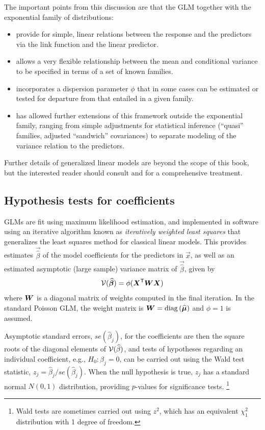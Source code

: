 \documentclass[11pt]{book}\usepackage[]{graphicx}\usepackage[]{color}
\begin{document}
The important points from this discussion are that the GLM together with the exponential
family of distributions:
\begin{itemize}
 \item provide for simple, linear relations between the response and the predictors
 via the link function and the linear predictor.
 \item allows a very flexible relationship between the mean and 
 conditional variance to be specified in terms of a set of known families.
 \item incorporates a dispersion parameter $\phi$ that in some cases can be estimated
 or tested for departure from that entailed in a given family.
 \item has allowed further extensions of this framework outside the exponential family,
 ranging from simple adjustments for statistical inference (``quasi'' families, 
 adjusted ``sandwich'' covariances) to separate modeling of the variance relation
 to the predictors.
\end{itemize}

Further details of generalized linear models are beyond the scope of this book, but
the interested reader should consult \citet[\S 15.3]{Fox:2008} 
and \citet[Ch. 4]{Agresti:2013} for a comprehensive
treatment.

\subsection{Hypothesis tests for coefficients}
GLMs are fit using maximum likelihood estimation, and implemented in software using
an iterative algorithm known as \emph{iteratively weighted least squares}
that generalizes the least squares method for classical linear models.
This provides estimates $\vec{\widehat{\beta}}$ of the model coefficients
for the predictors in $\vec{x}$, as well as an estimated asymptotic 
(large sample) variance matrix of $\vec{\widehat{\beta}}$, given by
\begin{equation}\label{eq:varbeta}
\mathcal{V} (\widehat{\bm{\beta}}) = \phi ( \bm{X}^\mathsf{T}  \bm{W} \bm{X} )
\end{equation}
where $\bm{W}$ is a diagonal matrix of weights computed in the final iteration.
In the standard Poisson GLM, the weight matrix is $\bm{W} = \mathrm{diag}\, (\widehat{\bm{\mu}})$
and $\phi=1$ is assumed.

Asymptotic standard errors, $ se (\widehat{\beta}_j)$,
for the coefficients are then the square roots of the
diagonal elements
of $\mathcal{V} (\widehat{\beta})$, and tests of hypotheses regarding
an individual coefficient, e.g., $H_0 : \beta_j = 0$, can be carried out
using the Wald test statistic,
$z_j = \widehat{\beta}_j / se (\widehat{\beta}_j)$.
When the null hypothesis is true, $z_j$ has a standard normal $N(0,1)$
distribution, providing $p$-values for significance tests.%
\footnote{Wald tests are sometimes carried out using $z^2$, which has an equivalent
$\chi^2_1$ distribution with 1 degree of freedom.
}
\end{document}
